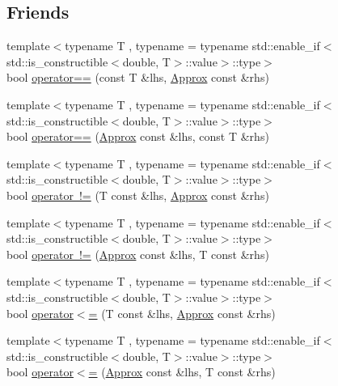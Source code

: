 \subsection*{Friends}
\begin{DoxyCompactItemize}
\item 
{\footnotesize template$<$typename T , typename  = typename std\+::enable\+\_\+if$<$std\+::is\+\_\+constructible$<$double, T$>$\+::value$>$\+::type$>$ }\\bool \mbox{\hyperlink{class_catch_1_1_detail_1_1_approx_ab38782a37d09b527ca5e126dbf433dda}{operator==}} (const T \&lhs, \mbox{\hyperlink{class_catch_1_1_detail_1_1_approx}{Approx}} const \&rhs)
\item 
{\footnotesize template$<$typename T , typename  = typename std\+::enable\+\_\+if$<$std\+::is\+\_\+constructible$<$double, T$>$\+::value$>$\+::type$>$ }\\bool \mbox{\hyperlink{class_catch_1_1_detail_1_1_approx_a0e5ef1957d4c38d7857005909c613743}{operator==}} (\mbox{\hyperlink{class_catch_1_1_detail_1_1_approx}{Approx}} const \&lhs, const T \&rhs)
\item 
{\footnotesize template$<$typename T , typename  = typename std\+::enable\+\_\+if$<$std\+::is\+\_\+constructible$<$double, T$>$\+::value$>$\+::type$>$ }\\bool \mbox{\hyperlink{class_catch_1_1_detail_1_1_approx_ad878de1a82eb134e32d3434bb3fddd54}{operator !=}} (T const \&lhs, \mbox{\hyperlink{class_catch_1_1_detail_1_1_approx}{Approx}} const \&rhs)
\item 
{\footnotesize template$<$typename T , typename  = typename std\+::enable\+\_\+if$<$std\+::is\+\_\+constructible$<$double, T$>$\+::value$>$\+::type$>$ }\\bool \mbox{\hyperlink{class_catch_1_1_detail_1_1_approx_a0902653024d8e11e76632b2faa1f6bd5}{operator !=}} (\mbox{\hyperlink{class_catch_1_1_detail_1_1_approx}{Approx}} const \&lhs, T const \&rhs)
\item 
{\footnotesize template$<$typename T , typename  = typename std\+::enable\+\_\+if$<$std\+::is\+\_\+constructible$<$double, T$>$\+::value$>$\+::type$>$ }\\bool \mbox{\hyperlink{class_catch_1_1_detail_1_1_approx_a0369de03e81bc2ceaf6c9d830476bd49}{operator$<$=}} (T const \&lhs, \mbox{\hyperlink{class_catch_1_1_detail_1_1_approx}{Approx}} const \&rhs)
\item 
{\footnotesize template$<$typename T , typename  = typename std\+::enable\+\_\+if$<$std\+::is\+\_\+constructible$<$double, T$>$\+::value$>$\+::type$>$ }\\bool \mbox{\hyperlink{class_catch_1_1_detail_1_1_approx_a6040b908588745570847d7ae8483b091}{operator$<$=}} (\mbox{\hyperlink{class_catch_1_1_detail_1_1_approx}{Approx}} const \&lhs, T const \&rhs)

\end{DoxyCompactItemize}
